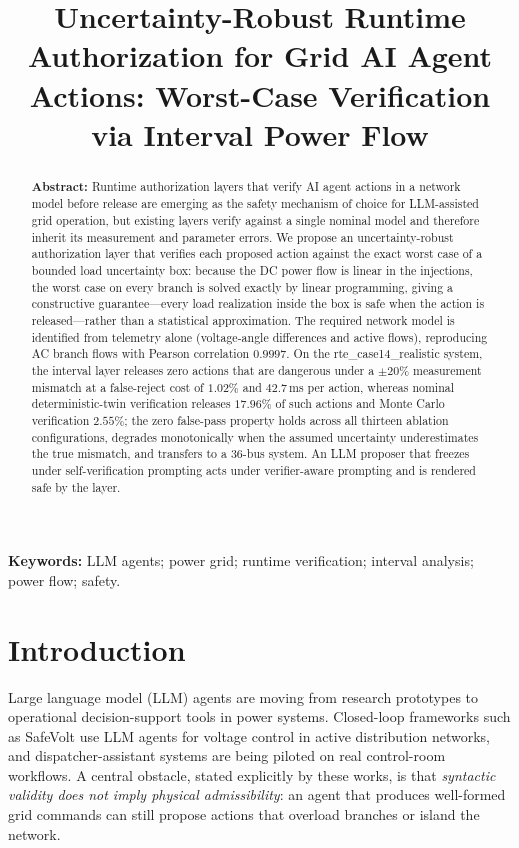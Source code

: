 \documentclass[11pt,a4paper]{article}
\begin{document}
\title{Uncertainty-Robust Runtime Authorization for Grid AI Agent Actions: Worst-Case Verification via Interval Power Flow}


\maketitle

\begin{abstract}
\noindent\textbf{Abstract:} 
Runtime authorization layers that verify AI agent actions in a network model
before release are emerging as the safety mechanism of choice for LLM-assisted
grid operation, but existing layers verify against a single nominal model and
therefore inherit its measurement and parameter errors. We propose an
uncertainty-robust authorization layer that verifies each proposed action
against the exact worst case of a bounded load uncertainty box: because the DC
power flow is linear in the injections, the worst case on every branch is
solved exactly by linear programming, giving a constructive guarantee---every
load realization inside the box is safe when the action is released---rather
than a statistical approximation. The required network model is identified
from telemetry alone (voltage-angle differences and active flows), reproducing
AC branch flows with Pearson correlation $0.9997$. On the
rte\_case14\_realistic system, the interval layer releases zero actions that
are dangerous under a $\pm 20\%$ measurement mismatch at a false-reject cost
of $1.02\%$ and $42.7$\,ms per action, whereas nominal deterministic-twin
verification releases $17.96\%$ of such actions and Monte Carlo verification
$2.55\%$; the zero false-pass property holds across all thirteen ablation
configurations, degrades monotonically when the assumed uncertainty
underestimates the true mismatch, and transfers to a 36-bus system. An LLM
proposer that freezes under self-verification prompting acts under
verifier-aware prompting and is rendered safe by the layer.
\end{abstract}

\noindent\textbf{Keywords:} LLM agents; power grid; runtime verification; interval analysis; power flow; safety.\par

\section{Introduction}
\label{sec:intro}

Large language model (LLM) agents are moving from research prototypes to operational
decision-support tools in power systems. Closed-loop frameworks such as SafeVolt
\cite{safevolt2026} use LLM agents for voltage control in active distribution
networks, and dispatcher-assistant systems are being piloted on real control-room
workflows. A central obstacle, stated explicitly by these works, is that
\textit{syntactic validity does not imply physical admissibility}: an agent that
produces well-formed grid commands can still propose actions that overload
branches or island the network.
\end{document}
